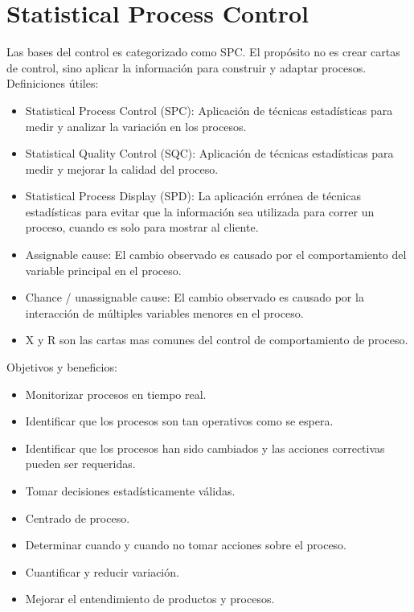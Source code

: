 \documentclass[]{article}
\begin{document}
\section{Statistical Process Control}

Las bases del control es categorizado como SPC. El propósito no es crear cartas de control, sino aplicar la información para construir y adaptar procesos.
Definiciones útiles:
\begin{itemize}
	\item Statistical Process Control (SPC): Aplicación de técnicas estadísticas para medir y analizar la variación en los procesos.
	\item Statistical Quality Control (SQC): Aplicación de técnicas estadísticas para medir y mejorar la calidad del proceso.
	\item Statistical Process Display (SPD): La aplicación errónea de técnicas estadísticas para evitar que la información sea utilizada para correr un proceso, cuando es solo para mostrar al cliente. 
	\item Assignable cause: El cambio observado es causado por el comportamiento del variable principal en el proceso.
	\item Chance / unassignable cause: El cambio observado es causado por la interacción de múltiples variables menores en el proceso.
	\item X y R son las cartas mas comunes del control de comportamiento de proceso.
\end{itemize}
Objetivos y beneficios:
\begin{itemize}
	\item Monitorizar procesos en tiempo real.
	\item Identificar que los procesos son tan operativos como se espera.
	\item Identificar que los procesos han sido cambiados y las acciones correctivas pueden ser requeridas.
	\item Tomar decisiones estadísticamente válidas.
	\item Centrado de proceso.
	\item Determinar cuando y cuando no tomar acciones sobre el proceso.
	\item Cuantificar y reducir variación.
	\item Mejorar el entendimiento de productos y procesos.
\end{itemize}
\end{document}
